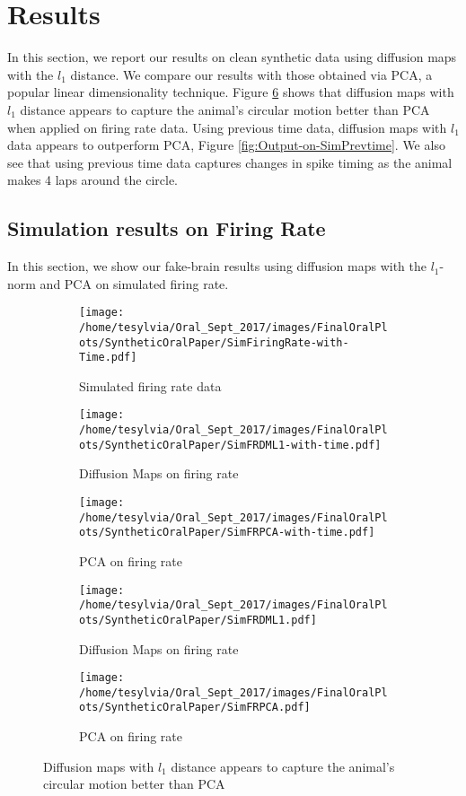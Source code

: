 
\section{Results}
In this section, we report our results on clean synthetic data
using diffusion maps with the $l_{1}$ distance. We compare our results with those obtained via PCA, a popular linear dimensionality technique. Figure \ref{fig:Output-on-SimFR} shows that diffusion maps  with $l_{1}$ distance appears to capture the animal's circular motion better than PCA when applied on firing rate data. Using previous time data, diffusion maps with $l_{1}$ data appears to outperform PCA, Figure \ref{fig:Output-on-SimPrevtime}.
We also see that using previous time data captures changes in spike timing
as the animal makes 4 laps around the circle.

\subsection{Simulation results on Firing Rate}
In this section, we show our fake-brain results using 
diffusion maps with the $l_1$-norm and PCA  on simulated firing rate.

\begin{figure}[h!]
\centering
\begin{subfigure}[b]{.45\linewidth}
\texttt{[image: /home/tesylvia/Oral\_Sept\_2017/images/FinalOralPlots/SyntheticOralPaper/SimFiringRate-with-Time.pdf]}
\caption{Simulated firing rate  data}\label{fig:SimFRwithTime}
\end{subfigure}

\begin{subfigure}[b]{.45\linewidth}
\texttt{[image: /home/tesylvia/Oral\_Sept\_2017/images/FinalOralPlots/SyntheticOralPaper/SimFRDML1-with-time.pdf]}
\caption{Diffusion Maps on firing rate}\label{fig:SimFRDML1vsTime}
\end{subfigure}
\begin{subfigure}[b]{.45\linewidth}
\texttt{[image: /home/tesylvia/Oral\_Sept\_2017/images/FinalOralPlots/SyntheticOralPaper/SimFRPCA-with-time.pdf]}
\caption{PCA on  firing rate}\label{fig:SimFRPCAvsTime}
\end{subfigure}
\begin{subfigure}[b]{.45\linewidth}
\texttt{[image: /home/tesylvia/Oral\_Sept\_2017/images/FinalOralPlots/SyntheticOralPaper/SimFRDML1.pdf]}
\caption{Diffusion Maps on firing rate}\label{fig:SimFRDML1-2D}
\end{subfigure}
\begin{subfigure}[b]{.45\linewidth}
\texttt{[image: /home/tesylvia/Oral\_Sept\_2017/images/FinalOralPlots/SyntheticOralPaper/SimFRPCA.pdf]}
\caption{PCA on firing rate}\label{fig:SimFRPCA-2D}
\end{subfigure}
\caption{Diffusion maps  with $l_{1}$ distance appears to capture the animal's circular motion better than PCA}
\label{fig:Output-on-SimFR}
\end{figure}

